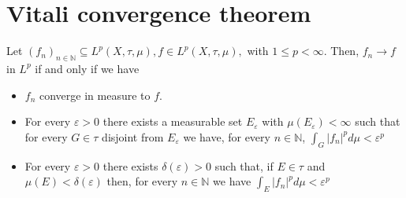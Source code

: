 \section{Vitali convergence theorem}

\begin{theorem}
Let $\left(f_{n}\right)_{n \in \mathbb{N}} \subseteq L^{p}(X, \tau, \mu), f \in L^{p}(X, \tau, \mu),$ with $1 \leq p<\infty .$ Then, $f_{n} \rightarrow f$ in $L^{p}$ if and only if we have
\begin{itemize}
	\item $f_{n}$ converge in measure to $f$.
	\item For every $\varepsilon>0$ there exists a measurable set $E_{\varepsilon}$ with $\mu\left(E_{\varepsilon}\right)<\infty$ such that for every $G \in \tau$ disjoint from $E_{\varepsilon}$ we have, for every $n \in \mathbb{N}$, $\int_{G}\left|f_{n}\right|^{p} d \mu<\varepsilon^{p}$
	\item  For every $\varepsilon>0$ there exists $\delta(\varepsilon)>0$ such that, if $E \in \tau$ and $\mu(E)<\delta(\varepsilon)$ then, for every $n \in \mathbb{N}$ we have $\int_{E}\left|f_{n}\right|^{p} d \mu<\varepsilon^{p}$	
\end{itemize}
\end{theorem}

